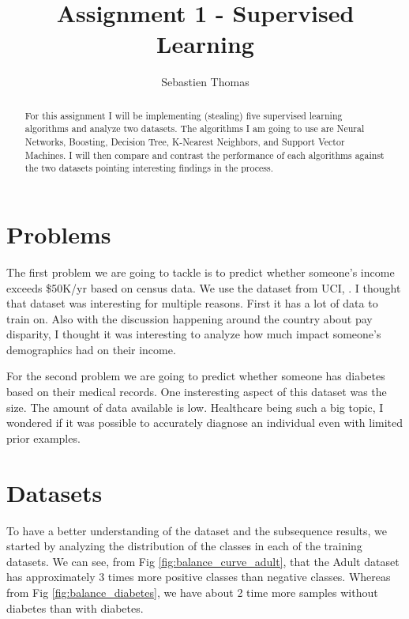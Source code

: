\documentclass[11pt, twocolumn]{article}
\title{Assignment 1 - Supervised Learning}
\author{Sebastien Thomas}
\begin{document}
    \maketitle

    \begin{abstract}
        For this assignment I will be implementing (stealing) five supervised learning algorithms and analyze two datasets. The algorithms I am going to use are Neural Networks, Boosting, Decision Tree, K-Nearest Neighbors, and Support Vector Machines. I will then compare and contrast the performance of each algorithms against the two datasets pointing interesting findings in the process.
    \end{abstract}

    \section[Problems]{Problems}
    The first problem we are going to tackle is to predict whether someone's income exceeds \$50K/yr based on census data.
    We use the dataset from UCI, \cite{adult}.
    I thought that dataset was interesting for multiple reasons.
    First it has a lot of data to train on.
    Also with the discussion happening around the country about pay disparity, I thought it was interesting to analyze how much impact someone's demographics had on their income.

    For the second problem we are going to predict whether someone has diabetes based on their medical records.
    One insteresting aspect of this dataset was the size.
    The amount of data available is low.
    Healthcare being such a big topic, I wondered if it was possible to accurately diagnose an individual even with limited prior examples.

    \section{Datasets}

    To have a better understanding of the dataset and the subsequence results, we started by analyzing the distribution of the classes in each of the training datasets. We can see, from Fig \ref{fig:balance_curve_adult}, that the Adult dataset has approximately 3 times more positive classes than negative classes. Whereas from Fig \ref{fig:balance_diabetes}, we have about 2 time more samples without diabetes than with diabetes.
\end{document}
